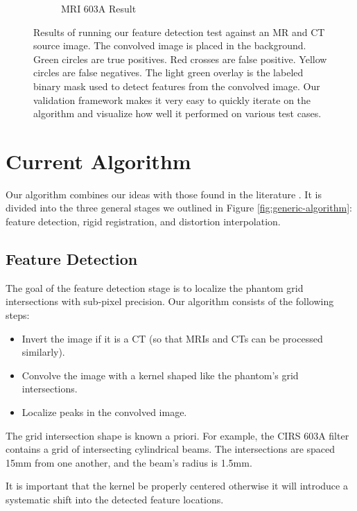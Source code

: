 \documentclass[12pt]{article}
\begin{document}
\begin{figure}
\begin{subfigure}[b]{0.48\textwidth}
        \caption{MRI 603A Result}
        \label{fig:testing-feature-detection_2}
    \end{subfigure}
    \caption{Results of running our feature detection test against an MR and CT source image.  The convolved image is placed in the background.  Green circles are true positives.  Red crosses are false positive.  Yellow circles are false negatives.  The light green overlay is the labeled binary mask used to detect features from the convolved image.  Our validation framework makes it very easy to quickly iterate on the algorithm and visualize how well it performed on various test cases.}
    \label{fig:feature-detection-run}
\end{figure}

\section{Current Algorithm}

Our algorithm combines our ideas with those found in the literature \cite{stanescu2010,baldwin2007}.  It is divided into the three general stages we outlined in Figure \ref{fig:generic-algorithm}: feature detection, rigid registration, and distortion interpolation.

\subsection{Feature Detection}

The goal of the feature detection stage is to localize the phantom grid intersections with sub-pixel precision.  Our algorithm consists of the following steps:

\begin{itemize}
    \item Invert the image if it is a CT (so that MRIs and CTs can be processed similarly).
    \item Convolve the image with a kernel shaped like the phantom's grid intersections.
    \item Localize peaks in the convolved image.
\end{itemize}

The grid intersection shape is known a priori.  For example, the CIRS 603A filter contains a grid of intersecting cylindrical beams.  The intersections are spaced 15mm from one another, and the beam's radius is 1.5mm.

It is important that the kernel be properly centered otherwise it will introduce a systematic shift into the detected feature locations.
\end{document}
